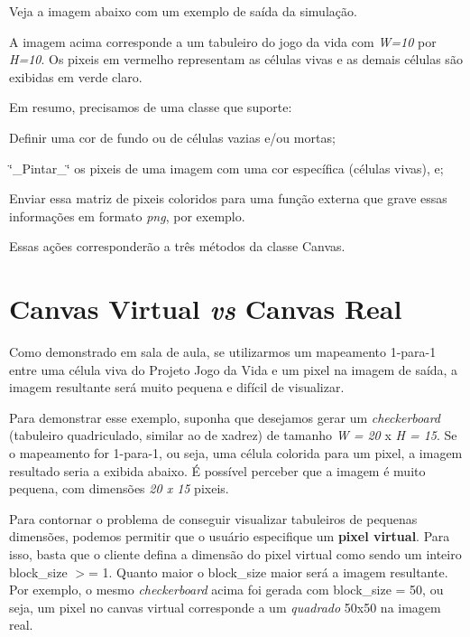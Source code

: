 Veja a imagem abaixo com um exemplo de saída da simulação.



A imagem acima corresponde a um tabuleiro do jogo da vida com {\itshape W=10} por {\itshape H=10}. Os pixeis em vermelho representam as células vivas e as demais células são exibidas em verde claro.

Em resumo, precisamos de uma classe que suporte\+:
\begin{DoxyEnumerate}
\item Definir uma cor de fundo ou de células vazias e/ou mortas;
\item \char`\"{}\+\_\+\+Pintar\+\_\+\char`\"{} os pixeis de uma imagem com uma cor específica (células vivas), e;
\item Enviar essa matriz de pixeis coloridos para uma função externa que grave essas informações em formato {\itshape png}, por exemplo.
\end{DoxyEnumerate}

Essas ações corresponderão a três métodos da classe {\ttfamily Canvas}.

\section*{Canvas Virtual {\itshape vs} Canvas Real}

Como demonstrado em sala de aula, se utilizarmos um mapeamento 1-\/para-\/1 entre uma célula viva do Projeto Jogo da Vida e um pixel na imagem de saída, a imagem resultante será muito pequena e difícil de visualizar.

Para demonstrar esse exemplo, suponha que desejamos gerar um {\itshape checkerboard} (tabuleiro quadriculado, similar ao de xadrez) de tamanho {\itshape W = 20} x {\itshape H = 15}. Se o mapeamento for 1-\/para-\/1, ou seja, uma célula colorida para um pixel, a imagem resultado seria a exibida abaixo. É possível perceber que a imagem é muito pequena, com dimensões {\itshape 20 x 15} pixeis.



Para contornar o problema de conseguir visualizar tabuleiros de pequenas dimensões, podemos permitir que o usuário especifique um {\bfseries{pixel virtual}}. Para isso, basta que o cliente defina a dimensão do pixel virtual como sendo um inteiro {\ttfamily block\+\_\+size} $>$= 1. Quanto maior o {\ttfamily block\+\_\+size} maior será a imagem resultante. Por exemplo, o mesmo {\itshape checkerboard} acima foi gerada com {\ttfamily block\+\_\+size} = 50, ou seja, um pixel no canvas virtual corresponde a um {\itshape quadrado} 50x50 na imagem real.


